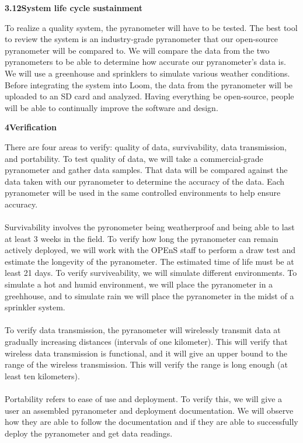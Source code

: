 \documentclass[10pt,draftclsnofoot,onecolumn,letterpaper]{article}
\begin{document}
{\fontsize{10pt}{12.0pt} \textbf{3.12\quad System life cycle sustainment}\\\selectfont 
\par}\par
{\fontsize{10pt}{12.0pt} To realize a quality system, the pyranometer will have to be tested. The best tool to review the system is an industry-grade pyranometer that our open-source pyranometer will be compared to. We will compare the data from the two pyranometers to be able to determine how accurate our pyranometer's data is. We will use a greenhouse and sprinklers to simulate various weather conditions. Before integrating the system into Loom, the data from the pyranometer will be uploaded to an SD card and analyzed. Having everything be open-source, people will be able to continually improve the software and design.\\\selectfont 
\par}\par

{\fontsize{12pt}{12.0pt} \textbf{4\quad Verification}\\\selectfont 
\par}\par
{\fontsize{10pt}{12.0pt} There are four areas to verify: quality of data, survivability, data transmission, and portability. To test quality of data, we will take a commercial-grade pyranometer and gather data samples. That data will be compared against the data taken with our pyranometer to determine the accuracy of the data. Each pyranometer will be used in the same controlled environments to help ensure accuracy.\\\\ Survivability involves the pyronometer being weatherproof and being able to last at least 3 weeks in the field. To verify how long the pyranometer can remain actively deployed, we will work with the OPEnS staff to perform a draw test and estimate the longevity of the pyranometer. The estimated time of life must be at least 21 days. To verify surviveability, we will simulate different environments. To simulate a hot and humid environment, we will place the pyranometer in a greehhouse, and to simulate rain we will place the pyranometer in the midst of a sprinkler system.\\\\To verify data transmission, the pyranometer will wirelessly transmit data at gradually increasing distances (intervals of one kilometer). This will verify that wireless data transmission is functional, and it will give an upper bound to the range of the wireless transmission. This will verify the range is long enough (at least ten kilometers).\\\\Portability refers to ease of use and deployment. To verify this, we will give a user an assembled pyranometer and deployment documentation. We will observe how they are able to follow the documentation and if they are able to successfully deploy the pyranometer and get data readings.\\\selectfont 
\par}\par
\end{document}

